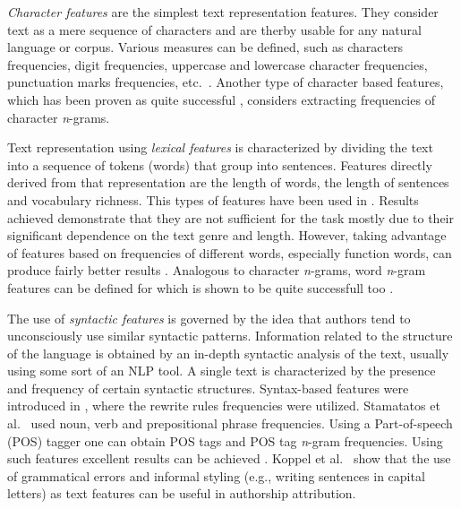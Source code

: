 \documentclass{llncs}
\begin{document}
\emph{Character features} are the simplest text representation features. They
consider text as a mere sequence of characters and are therby usable for any natural
language or corpus. Various measures can be defined, such as
characters frequencies, digit frequencies, uppercase and lowercase character
frequencies, punctuation marks frequencies, etc.\ \cite{de2001mining}. Another
type of character based features, which has been proven as quite successful
\cite{peng2003language,stamatatos2006ensemble}, considers extracting
frequencies of character \emph{n}-grams. 

Text representation using \emph{lexical features} is characterized by dividing
the text into a sequence of tokens (words) that group into sentences. Features
directly derived from that representation are the length of words, the
length of sentences and vocabulary richness. This types of features have been used in
\cite{holmes1994authorship,mendenhall1887} . Results achieved demonstrate that
they are not sufficient for the task mostly due to their
significant dependence on the text genre and length. However, taking advantage of
features based on frequencies of different words, especially function words,
can produce fairly better results
\cite{argamon2005measuring,koppel2003exploiting,uzuner2005comparative,zhao2005effective}.
Analogous to character \emph{n}-grams, word \emph{n}-gram features
can be defined for which is shown to be quite successfull too
\cite{coyotl2006authorship,keselj2003n}.

The use of \emph{syntactic features} is governed by the idea that authors tend to
unconsciously use similar syntactic patterns. Information related to the
structure of the language is obtained by an in-depth syntactic analysis of the
text, usually using some sort of an NLP tool. A single text is characterized by
the presence and frequency of certain syntactic structures. Syntax-based features
were introduced in \cite{van1996outside}, where the rewrite rules frequencies
were utilized. Stamatatos et al.\ \cite{stamatatos2001computer} used noun, verb
and prepositional phrase frequencies. Using a Part-of-speech (POS) tagger one can
obtain POS tags and POS tag \emph{n}-gram frequencies. Using such features
excellent results can be achieved
\cite{diederich2003authorship,koppel2003exploiting,kukushkina2001using,luyckx2005shallow}.
Koppel et al.\ \cite{koppel2003exploiting} show that the use of grammatical
errors and informal styling (e.g., writing sentences in capital letters) as text features
can be useful in authorship attribution.
\end{document}
